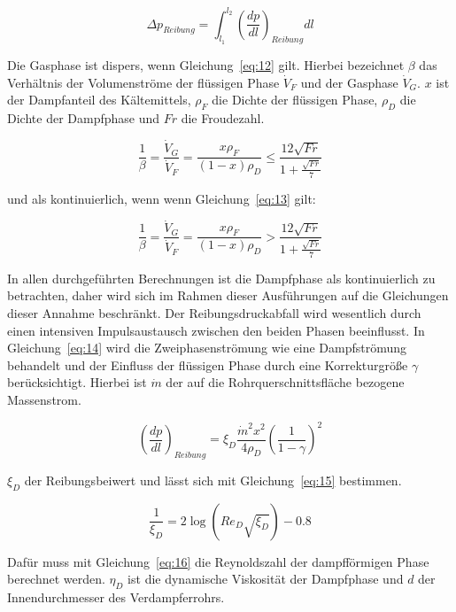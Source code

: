 \begin{equation}
\label{eq:11}
\Delta p_{Reibung} = \int_{l_1}^{l_2} \left( \frac{dp}{dl} \right)_{Reibung} dl
\end{equation}


Die Gasphase ist dispers, wenn Gleichung~\ref{eq:12} gilt. Hierbei bezeichnet $\beta$ das Verhältnis der Volumenströme der flüssigen Phase $\dot{V}_F$ und der Gasphase $\dot{V}_G$. $x$ ist der Dampfanteil des Kältemittels, $\rho_F$ die Dichte der flüssigen Phase, $\rho_D$ die Dichte der Dampfphase und $Fr$ die Froudezahl.

\begin{equation}
\label{eq:12}
\frac{1}{\beta} = \frac{\dot{V}_G}{\dot{V}_F} = \frac{x\rho_F}{(1-x)\rho_D} \leq \frac{12\sqrt{Fr}}{1+\frac{\sqrt{Fr}}{7}}
\end{equation}

und als kontinuierlich, wenn wenn Gleichung~\ref{eq:13} gilt:

\begin{equation}
\label{eq:13}
\frac{1}{\beta} = \frac{\dot{V}_G}{\dot{V}_F} = \frac{x\rho_F}{(1-x)\rho_D} > \frac{12\sqrt{Fr}}{1+\frac{\sqrt{Fr}}{7}}
\end{equation}

In allen durchgeführten Berechnungen ist die Dampfphase als kontinuierlich zu betrachten, daher wird sich im Rahmen dieser Ausführungen auf die Gleichungen dieser Annahme beschränkt. Der Reibungsdruckabfall wird wesentlich durch einen intensiven Impulsaustausch zwischen den beiden Phasen beeinflusst. In Gleichung~\ref{eq:14} wird die Zweiphasenströmung wie eine Dampfströmung behandelt und der Einfluss der flüssigen Phase durch eine Korrekturgröße $\gamma$ berücksichtigt. Hierbei ist $\dot{m}$ der auf die Rohrquerschnittsfläche bezogene Massenstrom.

\begin{equation}
\label{eq:14}
\left( \frac{dp}{dl} \right)_{Reibung} = \xi_D \frac{\dot{m}^2 x^2}{4\rho_D} \left(\frac{1}{1-\gamma} \right)^2
\end{equation}

$\xi_D$ der Reibungsbeiwert und lässt sich mit Gleichung~\ref{eq:15} bestimmen.

\begin{equation}
\label{eq:15}
\frac{1}{\xi_D} = 2\log(Re_D \sqrt{\xi_D})-0.8
\end{equation}

Dafür muss mit Gleichung~\ref{eq:16} die Reynoldszahl der dampfförmigen Phase berechnet werden. $\eta_D$ ist die dynamische Viskosität der Dampfphase und $d$ der Innendurchmesser des Verdampferrohrs.

